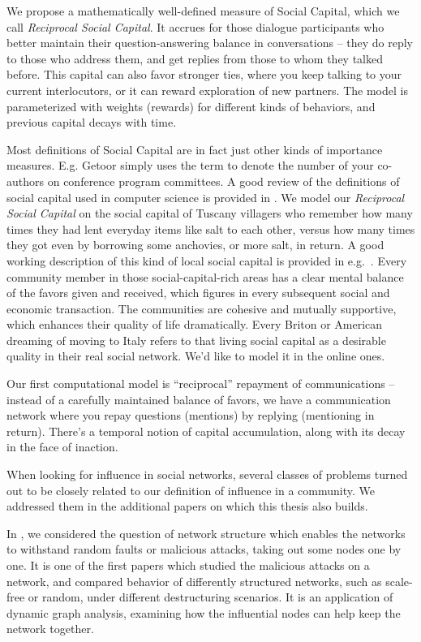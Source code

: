 \documentclass[10pt,oneside]{memoir}
\begin{document}
We propose a mathematically well-defined measure of Social Capital, which we call {\itshape Reciprocal Social Capital}.  It accrues for those dialogue participants who better maintain their question-answering balance in conversations -- they do reply to those who address them, and get replies from those to whom they talked before. This capital can also favor stronger ties, where you keep talking to your current interlocutors, or it can reward exploration of new partners. The model is parameterized with weights (rewards) for different kinds of behaviors, and previous capital decays with time.


Most definitions of Social Capital are in fact just other kinds of importance measures. E.g. Getoor \cite{Licamele:2005:Benefit} simply uses the term to denote the number of your co-authors on conference program committees. A good review of the definitions of social capital used in computer science is provided in \cite{Motidyang:2007:Thesis}. We model our {\itshape Reciprocal Social Capital} on the social capital of Tuscany villagers who remember how many times they had lent everyday items like salt to each other, versus how many times they got even by borrowing some anchovies, or more salt, in return. A good working description of this kind of local social capital is provided in e.g.\ \cite{Gaggio:2007:Gold}. Every community member in those social-capital-rich areas has a clear mental balance of the favors given and received, which figures in every subsequent social and economic transaction.  The communities are cohesive and mutually supportive, which enhances their quality of life dramatically.  Every Briton or American dreaming of moving to Italy refers to that living social capital as a desirable quality in their real social network.  We'd like to model it in the online ones.


Our first computational model is ``reciprocal'' repayment of communications -- instead of a carefully maintained balance of favors, we have a communication network where you repay questions (mentions) by replying (mentioning in return). There's a temporal notion of capital accumulation, along with its decay in the face of inaction.


When looking for influence in social networks, several classes of problems turned out to be closely related to our definition of influence in a community. We addressed them in the additional papers on which this thesis also builds.


In \cite{Khrabrov:2003:Attacks}, we considered the question of network structure which enables the networks to withstand random faults or malicious attacks, taking out some nodes one by one. It is one of the first papers which studied the malicious attacks on a network, and compared behavior of differently structured networks, such as scale-free or random, under different destructuring scenarios. It is an application of dynamic graph analysis, examining how the influential nodes can help keep the network together.
\end{document}
